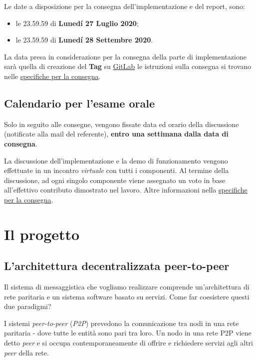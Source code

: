 \documentclass[
]{article}
\providecommand{\tightlist}{%
  \setlength{\itemsep}{0pt}\setlength{\parskip}{0pt}}
\begin{document}
Le date a disposizione per la consegna dell'implementazione e del
report, sono:

\begin{itemize}
\tightlist
\item
  le 23.59.59 di \textbf{Lunedí 27 Luglio 2020};
\item
  le 23.59.59 di \textbf{Lunedí 28 Settembre 2020}.
\end{itemize}

La data presa in considerazione per la consegna della parte di
implementazione sarà quella di creazione del \textbf{Tag} su
\href{https://gitlab.com}{GitLab} le istruzioni sulla consegna si
trovano nelle \href{consegna.md}{specifiche per la consegna}.

\hypertarget{calendario-per-lesame-orale}{%
\subsection{Calendario per l'esame
orale}\label{calendario-per-lesame-orale}}

Solo in seguito alle consegne, vengono fissate data ed orario della
discussione (notificate alla mail del referente), \textbf{entro una
settimana dalla data di consegna}.

La discussione dell'implementazione e la demo di funzionamento vengono
effettuate in un incontro \emph{virtuale} con tutti i componenti. Al
termine della discussione, ad ogni singolo componente viene assegnato un
voto in base all'effettivo contributo dimostrato nel lavoro. Altre
informazioni nella \href{consegna.md}{specifiche per la consegna}.

\hypertarget{il-progetto}{%
\section{Il progetto}\label{il-progetto}}

\hypertarget{larchitettura-decentralizzata-peer-to-peer}{%
\subsection{L'architettura decentralizzata
peer-to-peer}\label{larchitettura-decentralizzata-peer-to-peer}}

Il sistema di messaggistica che vogliamo realizzare comprende
un'architettura di rete paritaria e un sistema software basato su
servizi. Come far coesistere questi due paradigmi?

I sistemi \emph{peer-to-peer} (\emph{P2P}) prevedono la comunicazione
tra nodi in una rete paritaria - dove tutte le entità sono pari tra
loro. Un nodo in una rete P2P viene detto \emph{peer} e si occupa
contemporaneamente di offrire e richiedere servizi agli altri
\emph{peer} della rete.
\end{document}
